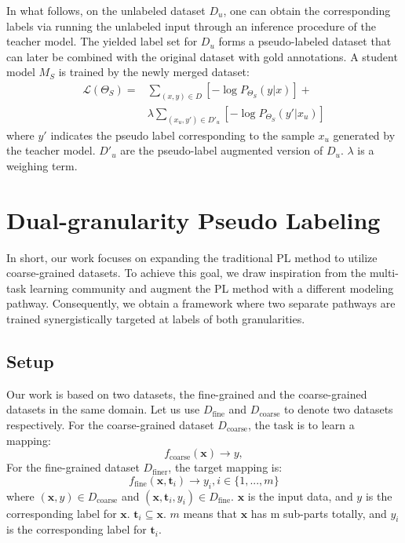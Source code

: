 \documentclass[11pt]{article}
\newcommand{\bx}{\mathbf{x}}
\newcommand{\bt}{\mathbf{t}}
\newcommand{\mL}{\mathcal{L}}
\begin{document}
In what follows, on the unlabeled dataset $D_u$, one can obtain the corresponding labels via running the unlabeled input through an inference procedure of the teacher model. 
The yielded label set for $D_u$ forms a pseudo-labeled dataset that can later be combined with the original dataset with gold annotations. 
A student model $M_S$ is trained by the newly merged dataset:
\begin{equation}
\begin{aligned}
    \mL(\Theta_{S}) = 
    & \sum_{(x,y) \in D} [-\log P_{\Theta_{S}}(y|x)] + \\
    & \lambda \sum_{(x_u, y') \in D'_u} [-\log P_{\Theta_{S}}(y'|x_u)]
\end{aligned}
\end{equation}
where $y'$ indicates the pseudo label corresponding to the sample $x_u$ generated by the teacher model. $D'_u$ are the pseudo-label augmented version of $D_u$. $\lambda$ is a weighing term.








\section{Dual-granularity Pseudo Labeling}

In short, our work focuses on expanding the traditional PL method to utilize coarse-grained datasets. To achieve this goal, we draw inspiration from the multi-task learning community and augment the PL method with a different modeling pathway. Consequently, we obtain a framework where two separate pathways are trained synergistically targeted at labels of both granularities.




















\subsection{Setup}
Our work is based on two datasets, the fine-grained and the coarse-grained datasets in the same domain.
Let us use $D_{\text{fine}}$ and $D_{\text{coarse}}$ to denote two datasets respectively.
For the coarse-grained dataset $D_{\text{coarse}}$, the task is to learn a mapping:
\begin{equation}
    f_{\text{coarse}}(\bx) \to y,
\end{equation}
For the fine-grained dataset $D_{\text{finer}}$, the target mapping is:
\begin{equation}
    f_{\text{fine}}(\bx, \bt_i) \to y_i, i \in \{1,...,m\}
\end{equation}
where $(\bx, y) \in D_{\text{coarse}}$ and $(\bx, \bt_i, y_i) \in D_{\text{fine}}$. 
$\bx$ is the input data, and $y$ is the corresponding label for $\bx$.
$\bt_i \subseteq \bx$. $m$ means that $\bx$ has m sub-parts totally, and $y_i$ is the corresponding label for $\bt_i$.
\end{document}
